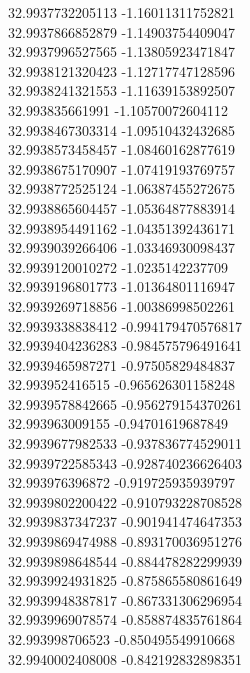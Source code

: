 {32.9937732205113	-1.16011311752821\\
32.9937866852879	-1.14903754409047\\
32.9937996527565	-1.13805923471847\\
32.9938121320423	-1.12717747128596\\
32.9938241321553	-1.11639153892507\\
32.993835661991	-1.10570072604112\\
32.9938467303314	-1.09510432432685\\
32.9938573458457	-1.08460162877619\\
32.9938675170907	-1.07419193769757\\
32.9938772525124	-1.06387455272675\\
32.9938865604457	-1.05364877883914\\
32.9938954491162	-1.04351392436171\\
32.9939039266406	-1.03346930098437\\
32.9939120010272	-1.0235142237709\\
32.9939196801773	-1.01364801116947\\
32.9939269718856	-1.00386998502261\\
32.9939338838412	-0.994179470576817\\
32.9939404236283	-0.984575796491641\\
32.9939465987271	-0.97505829484837\\
32.993952416515	-0.965626301158248\\
32.9939578842665	-0.956279154370261\\
32.993963009155	-0.94701619687849\\
32.9939677982533	-0.937836774529011\\
32.9939722585343	-0.928740236626403\\
32.993976396872	-0.919725935939797\\
32.9939802200422	-0.910793228708528\\
32.9939837347237	-0.901941474647353\\
32.9939869474988	-0.893170036951276\\
32.9939898648544	-0.884478282299939\\
32.9939924931825	-0.875865580861649\\
32.9939948387817	-0.867331306296954\\
32.9939969078574	-0.858874835761864\\
32.993998706523	-0.850495549910668\\
32.9940002408008	-0.842192832898351\\
}
